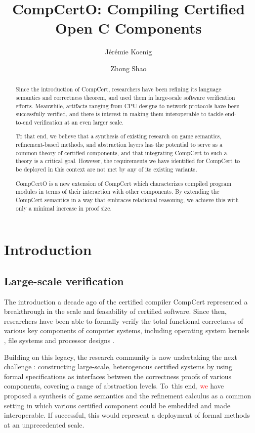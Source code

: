 \documentclass[acmsmall,authordraft]{acmart}
\title{CompCertO: Compiling Certified Open C Components} %
\author{J\'er\'emie Koenig}
\affiliation{Yale University}
\author{Zhong Shao}
\affiliation{Yale University}
\begin{document}
\begin{abstract} %
Since the introduction of CompCert,
researchers have been refining
its language semantics and correctness theorem,
and used them in
large-scale software verification efforts.
Meanwhile,
artifacts ranging from CPU designs to network protocols
have been successfully verified,
and there is interest in
making them interoperable
to tackle end-to-end verification
at an even larger scale.

To that end,
we believe that
a synthesis of existing research on
game semantics,
refinement-based methods, and
abstraction layers
has the potential to serve as a common theory
of certified components,
and that integrating CompCert to such a theory
is a critical goal.
However,
the requirements we have identified for
CompCert to be deployed in this context
are not met by any of its existing variants.

CompCertO is
a new extension of CompCert
which characterizes compiled program modules
in terms of their interaction with other components.
By extending the CompCert semantics
in a way that embraces relational reasoning,
we achieve this with only a minimal increase
in proof size.
\end{abstract}

\maketitle

\section{Introduction} %

\subsection{Large-scale verification} %

The introduction a decade ago of
the certified compiler CompCert \cite{compcert}
represented a breakthrough
in the scale and feasability of
certified software.
Since then,
researchers have been able to formally verify the
total functional correctness
of various key components of computer systems,
including
operating system kernels \cite{sel4,popl15},
file systems \cite{fscq} and
processor designs \cite{safe,kami}.

Building on this legacy,
the research community is now undertaking the next challenge
\cite{deepspec}:
constructing large-scale, heterogenous certified systems
by using formal specifications as interfaces
between the correctness proofs of various components,
covering a range of abstraction levels.
To~this end,
\textcolor{red}{we} have proposed
a synthesis of game semantics and the refinement calculus
\cite{rbgs-cal}
as a common setting
in which various
certified component could be embedded and
made interoperable.
If successful,
this would represent a deployment of formal methods
at an unprecedented scale.
\end{document}
